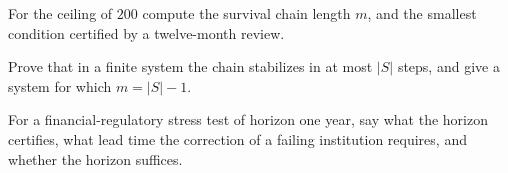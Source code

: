 \begin{exercise}
For the ceiling of $200$ compute the survival chain length $m$, and the smallest condition certified by a twelve-month review.
\end{exercise}
\begin{exercise}
Prove that in a finite system the chain stabilizes in at most $|S|$ steps, and give a system for which $m=|S|-1$.
\end{exercise}
\begin{exercise}
For a financial-regulatory stress test of horizon one year, say what the horizon certifies, what lead time the correction of a failing institution requires, and whether the horizon suffices.
\end{exercise}

